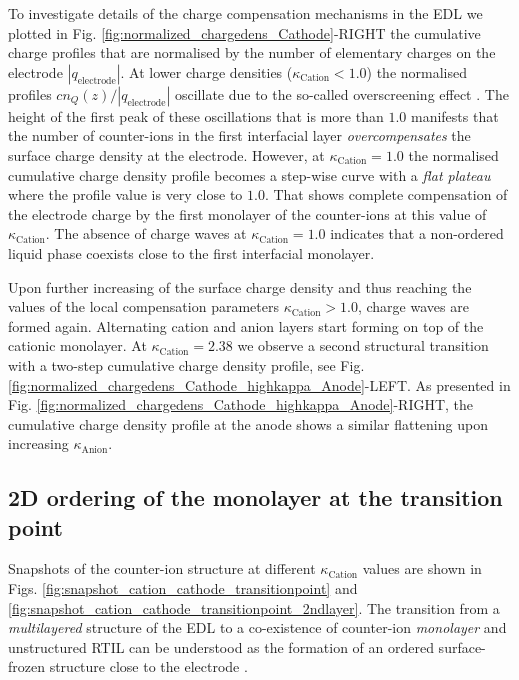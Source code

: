 \documentclass[final,5p,times,twocolumn]{elsarticle}
\begin{document}
To investigate details of the charge compensation mechanisms in the EDL we plotted in Fig. \ref{fig:normalized_chargedens_Cathode}-RIGHT the cumulative charge profiles that are normalised by the number of elementary charges on the electrode $|q_{\mathrm{electrode}}|$. At lower charge densities ($\kappa_{\mathrm{Cation}} < 1.0$) the normalised profiles  $cn_Q(z) / |q_{\mathrm{electrode}}|$ oscillate due to the so-called overscreening effect \cite{Fedorov2008,Georgi2010,Bazant2011}. The height of the first peak of these oscillations that is more than $1.0$ manifests that the number of counter-ions in the first interfacial layer \textit{overcompensates} the surface charge density at the electrode. However, at $\kappa_{\mathrm{Cation}} = 1.0$ the normalised cumulative charge density profile becomes a step-wise curve with a \textit{flat plateau} where the profile value is very close to $1.0$. That shows complete compensation of the electrode charge by the first monolayer of the counter-ions at this value of $\kappa_{\mathrm{Cation}}$. The absence of charge waves at $\kappa_{\mathrm{Cation}} = 1.0$ indicates that a non-ordered liquid phase coexists close to the first interfacial monolayer.

Upon further increasing of the surface charge density and thus reaching the values of the local compensation parameters $\kappa_{\mathrm{Cation}}>1.0$, charge waves are formed again. Alternating cation and anion layers start forming on top of the cationic monolayer. At $\kappa_{\mathrm{Cation}}=2.38$ we observe a second structural transition with a two-step cumulative charge density profile, see Fig. \ref{fig:normalized_chargedens_Cathode_highkappa_Anode}-LEFT. As presented in Fig. \ref{fig:normalized_chargedens_Cathode_highkappa_Anode}-RIGHT, the cumulative charge density profile at the anode shows a similar flattening upon increasing $\kappa_{\mathrm{Anion}}$.

\subsection{2D ordering of the monolayer at the transition point}

Snapshots of the counter-ion structure at different $\kappa_{\mathrm{Cation}}$ values are shown in Figs. \ref{fig:snapshot_cation_cathode_transitionpoint} and  \ref{fig:snapshot_cation_cathode_transitionpoint_2ndlayer}. The transition from a \textit{multilayered} structure of the EDL to a co-existence of counter-ion \textit{monolayer} and unstructured RTIL can be understood as the formation of an ordered surface-frozen structure close to the electrode \cite{Strandburg1988}.
\end{document}
